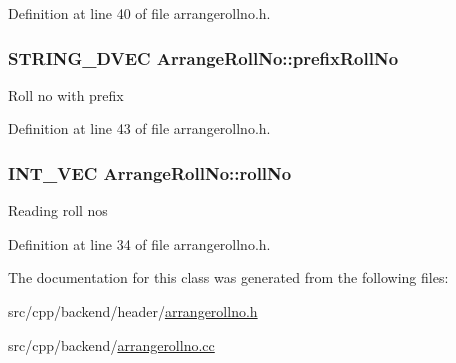Definition at line 40 of file arrangerollno.\-h.

\hypertarget{classArrangeRollNo_aa0401159b5d59c7afe77980a391a9a0a}{
\subsubsection[{prefix\-Roll\-No}]{\setlength{\rightskip}{0pt plus 5cm}S\-T\-R\-I\-N\-G\-\_\-D\-V\-E\-C Arrange\-Roll\-No\-::prefix\-Roll\-No\hspace{0.3cm}{\ttfamily [protected]}}}\label{classArrangeRollNo_aa0401159b5d59c7afe77980a391a9a0a}
Roll no with prefix 

Definition at line 43 of file arrangerollno.\-h.

\hypertarget{classArrangeRollNo_ad75d3ee3f709606da5b4871098c3e978}{
\subsubsection[{roll\-No}]{\setlength{\rightskip}{0pt plus 5cm}I\-N\-T\-\_\-\-V\-E\-C Arrange\-Roll\-No\-::roll\-No\hspace{0.3cm}{\ttfamily [protected]}}}\label{classArrangeRollNo_ad75d3ee3f709606da5b4871098c3e978}
Reading roll nos 

Definition at line 34 of file arrangerollno.\-h.



The documentation for this class was generated from the following files\-:\begin{DoxyCompactItemize}
\item 
src/cpp/backend/header/\hyperlink{arrangerollno_8h}{arrangerollno.\-h}\item 
src/cpp/backend/\hyperlink{arrangerollno_8cc}{arrangerollno.\-cc}\end{DoxyCompactItemize}
